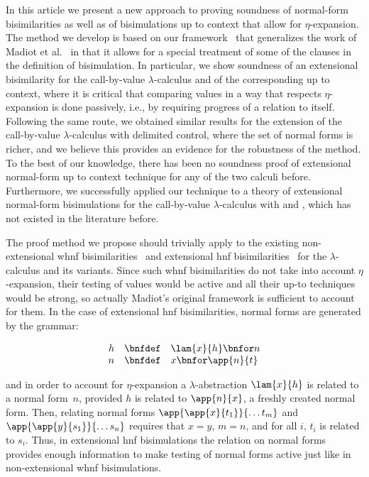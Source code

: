 \documentclass{lmcs}
\theoremstyle{defC}
\begin{document}
In this article we present a new approach to proving soundness of
normal-form bisimilarities as well as of bisimulations up to context
that allow for $\eta$-expansion. The method we develop is based on our
framework~\cite{Aristizabal-al:FSCD16} that generalizes the work of
Madiot et al.~\cite{Madiot-al:CONCUR14,Madiot:PhD} in that it allows
for a special treatment of some of the clauses in the definition of
bisimulation. In particular, we show soundness of an extensional
bisimilarity for the call-by-value $\lambda$-calculus and of the
corresponding up to context, where it is critical that
comparing values in a way that respects $\eta$-expansion is done
passively, i.e., by requiring progress of a relation to
itself. Following the same route, we obtained similar results for the
extension of the call-by-value $\lambda$-calculus with delimited
control, where the set of normal forms is richer, and we believe this
provides an evidence for the robustness of the method. To the best of
our knowledge, there has been no soundness proof of extensional
normal-form up to context technique for any of the two calculi
before. Furthermore, we successfully applied our technique to a theory
of extensional normal-form bisimulations for the call-by-value
$\lambda$-calculus with \textcallcc and \textabort, which has not existed in the
literature before.

The proof method we propose should trivially apply to the existing
non-ex\-ten\-sio\-nal whnf
bisimilarities~\cite{Lassen:99,Lassen:MFPS99,Lassen:MFPS05} and extensional hnf
bisimilarities~\cite{Lassen:MFPS99,Lassen:LICS06} for the $\lambda$-calculus and
its variants. Since such whnf bisimilarities do not take into account
$\eta$-expansion, their testing of values would be active and all their up-to
techniques would be strong, so actually Madiot's original framework is
sufficient to account for them. In the case of extensional hnf bisimilarities,
normal forms are generated by the grammar:

\[
\begin{array}{rcl}
  h & \bnfdef & \lam{x}{h} \bnfor n
  \\
  n & \bnfdef & x \bnfor \app{n}{t}
\end{array}
\]

\vspace{2mm}\noindent and in order to account for $\eta$-expansion a
$\lambda$-abstraction $\lam{x}{h}$ is related to a normal form~$n$, provided $h$
is related to $\app{n}{x}$, a freshly created normal form. Then, relating normal
forms $\app{\app{x}{t_1}}{\dots t_m}$ and $\app{\app{y}{s_1}}{\dots s_n}$
requires that $x = y$, $m = n$, and for all $i$, $t_i$ is related to
$s_i$. Thus, in extensional hnf bisimulations the relation on normal forms
provides enough information to make testing of normal forms active just like in
non-extensional whnf bisimulations.
\end{document}
